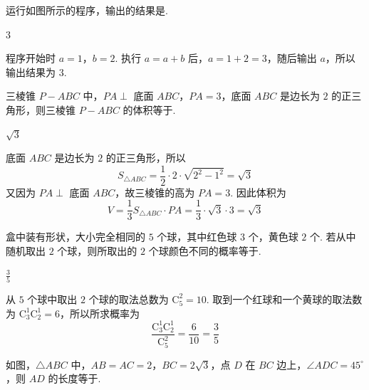 \begin{problem}
运行如图所示的程序，输出的结果是\fillinblank{}.

\end{problem}

\begin{answer}
3
\end{answer}

\begin{solution}
程序开始时 \(a=1\)，\(b=2\). 执行 \(a=a+b\) 后，\(a=1+2=3\)，随后输出 \(a\)，所以输出结果为 \(3\).
\end{solution}

\begin{problem}
三棱锥 \(P - ABC\) 中，\(PA \perp\) 底面 \(ABC\)，\(PA = 3\)，底面 \(ABC\) 是边长为 \(2\) 的正三角形，则三棱锥 \(P - ABC\) 的体积等于\fillinblank{}.
\end{problem}

\begin{answer}
\(\sqrt{3}\)
\end{answer}

\begin{solution}
底面 \(ABC\) 是边长为 \(2\) 的正三角形，所以
\[
S_{\triangle ABC}=\frac{1}{2}\cdot2\cdot\sqrt{2^2-1^2}=\sqrt{3}
\]
又因为 \(PA\perp\) 底面 \(ABC\)，故三棱锥的高为 \(PA=3\). 因此体积为
\[
V=\frac{1}{3}S_{\triangle ABC}\cdot PA=\frac{1}{3}\cdot\sqrt{3}\cdot3=\sqrt{3}
\]
\end{solution}

\begin{problem}
盒中装有形状，大小完全相同的 \(5\) 个球，其中红色球 \(3\) 个，黄色球 \(2\) 个. 若从中随机取出 \(2\) 个球，则所取出的 \(2\) 个球颜色不同的概率等于\fillinblank{}.
\end{problem}

\begin{answer}
\(\frac{3}{5}\)
\end{answer}

\begin{solution}
从 \(5\) 个球中取出 \(2\) 个球的取法总数为 \(\mathrm C_5^2=10\). 取到一个红球和一个黄球的取法数为 \(\mathrm C_3^1\mathrm C_2^1=6\)，所以所求概率为
\[
\frac{\mathrm C_3^1\mathrm C_2^1}{\mathrm C_5^2}=\frac{6}{10}=\frac{3}{5}
\]
\end{solution}

\begin{problem}
如图，\(\triangle ABC\) 中，\(AB = AC = 2\)，\(BC = 2\sqrt{3}\)，点 \(D\) 在 \(BC\) 边上，\(\angle ADC = 45^\circ\)，则 \(AD\) 的长度等于\fillinblank{}.

\end{problem}

